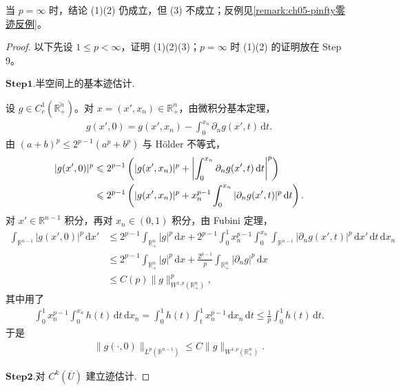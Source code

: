 当 $p=\infty$ 时，结论 (1)(2) 仍成立，但 (3) 不成立；反例见\cref{remark:ch05-pinfty零迹反例}。

\begin{proof}
以下先设 $1\leqslant p<\infty$，证明 (1)(2)(3)；$p=\infty$ 时 (1)(2) 的证明放在 Step 9。

\noindent$\mathbf{Step}\mathbf{1}.${\heiti 半空间上的基本迹估计.}

设 $g\in C^{1}_{c}(\overline{\mathbb{R}^{n}_{+}})$。对 $x=(x',x_{n})\in\mathbb{R}^{n}_{+}$，由微积分基本定理，
\begin{align*}
g(x',0)=g(x',x_{n})-\int_{0}^{x_{n}}\partial_{n}g(x',t)\,\mathrm{d}t.
\end{align*}
由 $(a+b)^{p}\leqslant 2^{p-1}(a^{p}+b^{p})$ 与 Hölder 不等式，
\begin{align}
|g(x',0)|^{p}
&\leqslant 2^{p-1}\left(|g(x',x_{n})|^{p}
+\left|\int_{0}^{x_{n}}\partial_{n}g(x',t)\,\mathrm{d}t\right|^{p}\right)
\notag\\
&\leqslant 2^{p-1}\left(|g(x',x_{n})|^{p}
+x_{n}^{p-1}\int_{0}^{x_{n}}|\partial_{n}g(x',t)|^{p}\,\mathrm{d}t\right).
\label{eq:ch05-证明-半空间逐点}
\end{align}
对 $x'\in\mathbb{R}^{n-1}$ 积分，再对 $x_{n}\in(0,1)$ 积分，由 Fubini 定理，
\begin{align*}
\int_{\mathbb{R}^{n-1}}|g(x',0)|^{p}\,\mathrm{d}x'
&\leqslant
2^{p-1}\int_{\mathbb{R}^{n}_{+}}|g|^{p}\,\mathrm{d}x
+2^{p-1}\int_{0}^{1}x_{n}^{p-1}
\int_{0}^{x_{n}}\int_{\mathbb{R}^{n-1}}
|\partial_{n}g(x',t)|^{p}\,\mathrm{d}x'\,\mathrm{d}t\,\mathrm{d}x_{n}\\
&\leqslant
2^{p-1}\int_{\mathbb{R}^{n}_{+}}|g|^{p}\,\mathrm{d}x
+\frac{2^{p-1}}{p}\int_{\mathbb{R}^{n}_{+}}|\partial_{n}g|^{p}\,\mathrm{d}x\\
&\leqslant C(p)\|g\|_{W^{1,p}(\mathbb{R}^{n}_{+})}^{p},
\end{align*}
其中用了
\begin{align*}
\int_{0}^{1}x_{n}^{p-1}\int_{0}^{x_{n}}h(t)\,\mathrm{d}t\,\mathrm{d}x_{n}
=\int_{0}^{1}h(t)\int_{t}^{1}x_{n}^{p-1}\,\mathrm{d}x_{n}\,\mathrm{d}t
\leqslant\frac{1}{p}\int_{0}^{1}h(t)\,\mathrm{d}t.
\end{align*}
于是
\begin{align}
\|g(\cdot,0)\|_{L^{p}(\mathbb{R}^{n-1})}
\leqslant C\|g\|_{W^{1,p}(\mathbb{R}^{n}_{+})}.
\label{eq:ch05-证明-半空间估计}
\end{align}

\noindent$\mathbf{Step}\mathbf{2}.${\heiti 对 $C^{k}(\overline{U})$ 建立迹估计.}


\end{proof}
